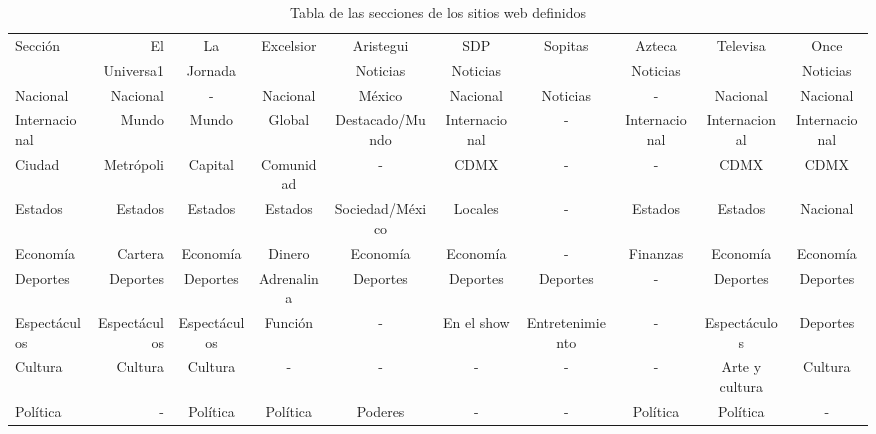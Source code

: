 \begin{table}[htbp]
	\begin{center}
	\begin{tabular}{|lrcccccccc|}
		\hline
		Sección  & El            & La           & Excelsior     & Aristegui             & SDP           & Sopitas   & Azteca            & Televisa      & Once  \\ 
                 & Universa1     & Jornada      &               & Noticias              & Noticias      &           & Noticias          &               & Noticias      \\ \hline
        Nacional & Nacional      & -            & Nacional      & México                & Nacional      & Noticias  & -                 & Nacional      & Nacional      \\ \hline
        Internacional & Mundo    & Mundo        & Global        & Destacado/Mundo       & Internacional & -         & Internacional     & Internacional & Internacional \\ \hline
        Ciudad   & Metrópoli     & Capital      & Comunidad     & -                     & CDMX          & -         & -                 & CDMX          & CDMX      \\ \hline
        Estados  & Estados       & Estados      & Estados       & Sociedad/México       & Locales       & -         & Estados           & Estados       & Nacional   \\ \hline
        Economía & Cartera       & Economía     & Dinero        & Economía              & Economía      & -         & Finanzas          & Economía      & Economía   \\ \hline
        Deportes & Deportes      & Deportes     & Adrenalina    & Deportes              & Deportes      & Deportes  & -                 & Deportes      & Deportes   \\ \hline
        Espectáculos & Espectáculos & Espectáculos & Función    & -                     & En el show    & Entretenimiento & -           & Espectáculos  & Deportes    \\ \hline
        Cultura  & Cultura       & Cultura      & -             & -                     & -             & -         & -                 & Arte y cultura & Cultura   \\ \hline
        Política & -             & Política     & Política      & Poderes               & -             & -         & Política          & Política      & -   \\ \hline
        
		\hline
	\end{tabular}
	\caption{Tabla de las secciones de los sitios web definidos}
	\label{tabla:sitios}
	\end{center}
\end{table}


